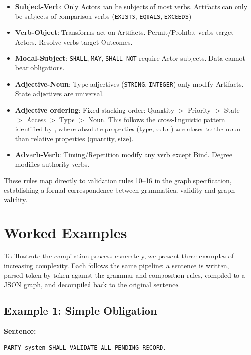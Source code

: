 \documentclass{article}
\begin{document}
\begin{itemize}
    \item \textbf{Subject-Verb}: Only Actors can be subjects of most verbs. Artifacts can only be subjects of comparison verbs (\texttt{EXISTS}, \texttt{EQUALS}, \texttt{EXCEEDS}).
    \item \textbf{Verb-Object}: Transforms act on Artifacts. Permit/Prohibit verbs target Actors. Resolve verbs target Outcomes.
    \item \textbf{Modal-Subject}: \texttt{SHALL}, \texttt{MAY}, \texttt{SHALL\_NOT} require Actor subjects. Data cannot bear obligations.
    \item \textbf{Adjective-Noun}: Type adjectives (\texttt{STRING}, \texttt{INTEGER}) only modify Artifacts. State adjectives are universal.
    \item \textbf{Adjective ordering}: Fixed stacking order: Quantity $>$ Priority $>$ State $>$ Access $>$ Type $>$ Noun. This follows the cross-linguistic pattern identified by \citet{sproat1991crosslinguistic}, where absolute properties (type, color) are closer to the noun than relative properties (quantity, size).
    \item \textbf{Adverb-Verb}: Timing/Repetition modify any verb except Bind. Degree modifies authority verbs.
\end{itemize}

These rules map directly to validation rules 10--16 in the graph specification, establishing a formal correspondence between grammatical validity and graph validity.

\section{Worked Examples}

To illustrate the compilation process concretely, we present three examples of increasing complexity. Each follows the same pipeline: a sentence is written, parsed token-by-token against the grammar and composition rules, compiled to a JSON graph, and decompiled back to the original sentence.

\subsection{Example 1: Simple Obligation}

\textbf{Sentence:}
\begin{lstlisting}[style=trugs]
PARTY system SHALL VALIDATE ALL PENDING RECORD.
\end{lstlisting}
\end{document}
